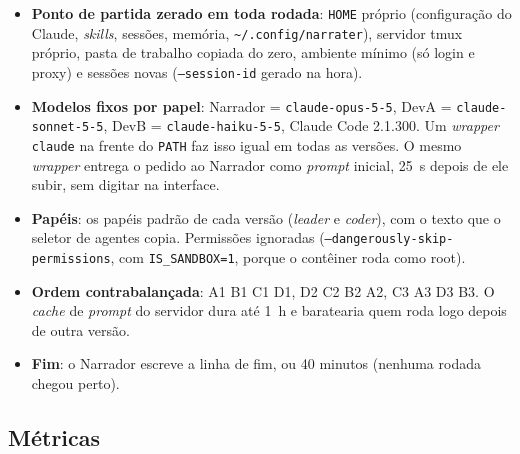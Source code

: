 \documentclass[11pt,a4paper]{article}
\begin{document}
\begin{itemize}
\item \textbf{Ponto de partida zerado em toda rodada}: \texttt{HOME} próprio (configuração do Claude,
  \emph{skills}, sessões, memória, \texttt{\~{}/.config/narrater}), servidor tmux próprio, pasta de trabalho
  copiada do zero, ambiente mínimo (só login e proxy) e sessões novas (\texttt{--session-id} gerado na hora).
\item \textbf{Modelos fixos por papel}: Narrador = \texttt{claude-opus-5-5}, DevA = \texttt{claude-sonnet-5-5},
  DevB = \texttt{claude-haiku-5-5}, Claude Code 2.1.300. Um \emph{wrapper} \texttt{claude} na frente do
  \texttt{PATH} faz isso igual em todas as versões. O mesmo \emph{wrapper} entrega o pedido ao Narrador
  como \emph{prompt} inicial, 25~s depois de ele subir, sem digitar na interface.
\item \textbf{Papéis}: os papéis padrão de cada versão (\emph{leader} e \emph{coder}), com o texto que o
  seletor de agentes copia. Permissões ignoradas (\texttt{--dangerously-skip-permissions}, com
  \texttt{IS\_SANDBOX=1}, porque o contêiner roda como root).
\item \textbf{Ordem contrabalançada}: A1 B1 C1 D1, D2 C2 B2 A2, C3 A3 D3 B3. O \emph{cache} de
  \emph{prompt} do servidor dura até 1~h e baratearia quem roda logo depois de outra versão.
\item \textbf{Fim}: o Narrador escreve a linha de fim, ou 40 minutos (nenhuma rodada chegou perto).
\end{itemize}

\subsection{Métricas}
\end{document}
